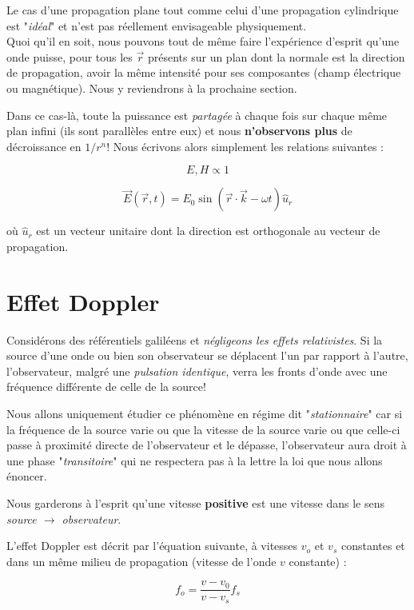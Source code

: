 Le cas d'une propagation plane tout comme celui d'une propagation cylindrique est "\textit{idéal}" et n'est pas réellement envisageable physiquement. \\
Quoi qu'il en soit, nous pouvons tout de même faire l'expérience d'esprit qu'une onde puisse, pour tous les $\vec{r}$ présents sur un plan dont la normale est la direction 
de propagation, avoir la même intensité pour ses composantes (champ électrique ou magnétique). Nous y reviendrons à la prochaine section.

Dans ce cas-là, toute la puissance est \textit{partagée} à chaque fois sur chaque même plan infini (ils sont parallèles entre eux) et nous \textbf{n'observons plus} de décroissance 
en $1/r^{n}$! Nous écrivons alors simplement les relations suivantes : 

\[E,H \propto 1\]

\[\vec{E}(\vec{r},t) = E_{0} \sin(\vec{r}\cdot \vec{k}-\omega t) \hat{u}_{r}\]

où $\hat{u}_{r}$ est un vecteur unitaire dont la direction est orthogonale au vecteur de propagation.

\section{Effet Doppler}

Considérons des référentiels galiléens et \textit{négligeons les effets relativistes}. 
Si la source d'une onde ou bien son observateur se déplacent l'un par rapport à l'autre, l'observateur, malgré une \textit{pulsation identique}, verra les fronts d'onde avec une fréquence différente de celle de la source!

Nous allons uniquement étudier ce phénomène en régime dit "\textit{stationnaire}" car si la fréquence de la source varie ou que la vitesse de la source varie ou que celle-ci 
passe à proximité directe de l'observateur et le dépasse, l'observateur aura droit à une phase "\textit{transitoire}" qui ne respectera pas à la lettre la loi que nous allons énoncer.

Nous garderons à l'esprit qu'une vitesse \textbf{positive} est une vitesse dans le sens \textit{source $\rightarrow$ observateur}.

L'effet Doppler est décrit par l'équation suivante, à vitesses $v_{o}$ et $v_{s}$ constantes et dans un même milieu de propagation (vitesse de l'onde $v$ constante) : 

\[f_{o} = \frac{v-v_{0}}{v-v_{s}}f_{s}\]

